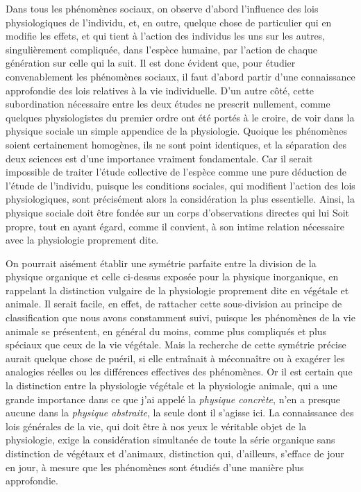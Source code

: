\documentclass[french,twoside]{book} %
\begin{document}
Dans tous les phénomènes sociaux, on observe d’abord l’influence des lois physiologiques de l’individu, et, en outre, quelque chose de particulier qui en modifie les effets, et qui tient à l’action des individus les uns sur les autres, singulièrement compliquée, dans l’espèce humaine, par l’action de chaque génération sur celle qui la suit. Il est donc évident que, pour étudier convenablement les phénomènes sociaux, il faut d’abord partir d’une connaissance approfondie des lois relatives à la vie individuelle. D’un autre côté, cette subordination nécessaire entre les deux études ne prescrit nullement, comme quelques physiologistes du premier ordre ont été portés à le croire, de voir dans la physique sociale un simple appendice de la physiologie. Quoique les phénomènes soient certainement homogènes, ils ne sont point identiques, et la séparation des deux sciences est d’une importance vraiment fondamentale. Car il serait impossible de traiter l’étude collective de l’espèce comme une pure déduction de l’étude de l’individu, puisque les conditions sociales, qui modifient l’action des lois physiologiques, sont précisément alors la considération la plus essentielle. Ainsi, la physique sociale doit être fondée sur un corps d’observations directes qui lui Soit propre, tout en ayant égard, comme il convient, à son intime relation nécessaire avec la physiologie proprement dite.\par
On pourrait aisément établir une symétrie parfaite entre la division de la physique organique et celle ci-dessus exposée pour la physique inorganique, en rappelant la distinction vulgaire de la physiologie proprement dite en végétale et animale. Il serait facile, en effet, de rattacher cette sous-division au principe de classification que nous avons constamment suivi, puisque les phénomènes de la vie animale se présentent, en général du moins, comme plus compliqués et plus spéciaux que ceux de la vie végétale. Mais la recherche de cette symétrie précise aurait quelque chose de puéril, si elle entraînait à méconnaître ou à exagérer les analogies réelles ou les différences effectives des phénomènes. Or il est certain que la distinction entre la physiologie végétale et la physiologie animale, qui a une grande importance dans ce que j’ai appelé la {\itshape physique concrète}, n’en a presque aucune dans la {\itshape physique abstraite}, la seule dont il s’agisse ici. La connaissance des lois générales de la vie, qui doit être à nos yeux le véritable objet de la physiologie, exige la considération simultanée de toute la série organique sans distinction de végétaux et d’animaux, distinction qui, d’ailleurs, s’efface de jour en jour, à mesure que les phénomènes sont étudiés d’une manière plus approfondie.\par
\end{document}
